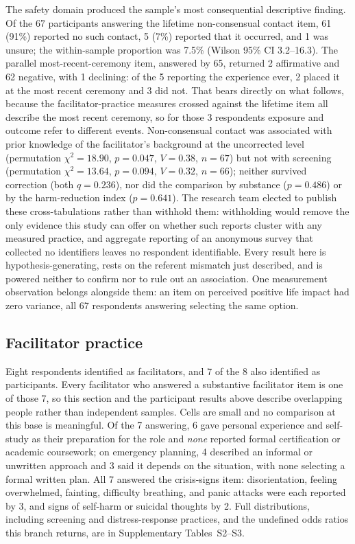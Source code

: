 \documentclass[12pt]{article}
\begin{document}
The safety domain produced the sample's most consequential descriptive finding. Of the 67 participants
answering the lifetime non-consensual contact item, 61 (91\%) reported no such contact, 5 (7\%) reported
that it occurred, and 1 was unsure; the within-sample proportion was 7.5\% (Wilson 95\% CI 3.2--16.3). The
parallel most-recent-ceremony item, answered by 65, returned 2 affirmative and 62 negative, with 1
declining: of the 5 reporting the experience ever, 2 placed it at the most recent ceremony and 3 did not.
That bears directly on what follows, because the facilitator-practice measures crossed against the lifetime
item all describe the most recent ceremony, so for those 3 respondents exposure and outcome refer to
different events. Non-consensual contact was associated with prior knowledge of the facilitator's
background at the uncorrected level (permutation $\chi^2 = 18.90$, $p=0.047$, $V=0.38$, $n=67$) but not
with screening (permutation $\chi^2 = 13.64$, $p=0.094$, $V=0.32$, $n=66$); neither survived correction
(both $q=0.236$), nor did the comparison by substance ($p=0.486$) or by the harm-reduction index
($p=0.641$). The research team elected to publish these cross-tabulations rather than withhold them:
withholding would remove the only evidence this study can offer on whether such reports cluster with any
measured practice, and aggregate reporting of an anonymous survey that collected no identifiers leaves no
respondent identifiable. Every result here is hypothesis-generating, rests on the referent mismatch just
described, and is powered neither to confirm nor to rule out an association. One measurement observation
belongs alongside them: an item on perceived positive life impact had zero variance, all 67 respondents
answering selecting the same option.

\subsection{Facilitator practice}

Eight respondents identified as facilitators, and 7 of the 8 also identified as participants. Every
facilitator who answered a substantive facilitator item is one of those 7, so this section and the
participant results above describe overlapping people rather than independent samples. Cells are small and
no comparison at this base is meaningful. Of the 7 answering, 6 gave personal experience and self-study as
their preparation for the role and \emph{none} reported formal certification or academic coursework; on
emergency planning, 4 described an informal or unwritten approach and 3 said it depends on the situation,
with none selecting a formal written plan. All 7 answered the crisis-signs item: disorientation, feeling
overwhelmed, fainting, difficulty breathing, and panic attacks were each reported by 3, and signs of
self-harm or suicidal thoughts by 2. Full distributions, including screening and distress-response
practices, and the undefined odds ratios this branch returns, are in Supplementary Tables~S2--S3.
\end{document}
